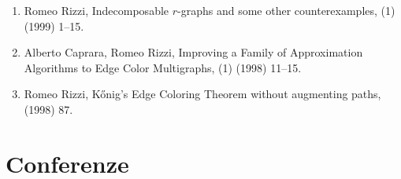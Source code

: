 \documentclass[11pt]{article}
\begin{document}
\begin{enumerate}
  \item {\sc Romeo Rizzi},
   \newblock  Indecomposable $r$-graphs and some other counterexamples,
   (1) (1999) 1--15.

  \item {\sc Alberto Caprara, Romeo Rizzi},  
   \newblock  Improving a Family of Approximation
              Algorithms to Edge Color Multigraphs,
   (1) (1998) 11--15.

  \item {\sc Romeo Rizzi},
   \newblock  K\H{o}nig's Edge Coloring Theorem without augmenting paths,
    (1998) 87.

\end{enumerate}


\section{Conferenze}
\end{document}

